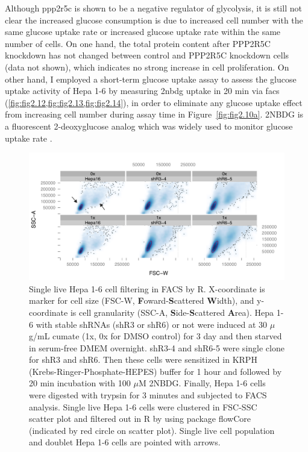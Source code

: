 Although \gls{ppp2r5c} is shown to be a negative regulator of glycolysis, it is still not clear the increased glucose consumption is due to increased cell number with the same glucose uptake rate or increased glucose uptake rate within the same number of cells. On one hand, the total protein content after PPP2R5C knockdown has not changed between control and PPP2R5C knockdown cells (data not shown), which indicates no strong increase in cell proliferation. On other hand, I employed a short-term glucose uptake assay to assess the glucose uptake activity of Hepa 1-6 by measuring \gls{2nbdg} uptake in 20 min via \gls{facs} (\cref{fig:fig2.12,fig:fig2.13,fig:fig2.14}), in order to eliminate any glucose uptake effect from increasing cell number during assay time in Figure~\ref{fig:fig2.10a}. 2NBDG is a fluorescent 2-deoxyglucose analog which was widely used to monitor glucose uptake rate \cite{zou_2-nbdg_2005,nitin_molecular_2009,oneil_uptake_2005,zhong_histone_2010,kawauchi_p53_2008}.

\begin{figure}[!tbp]
\centering
\includegraphics[width=1\textwidth]{figs/fig2-12 facs filter new.pdf}
\caption[FACS filtering for single live Hepa 1-6 cell]{\footnotesize Single live Hepa 1-6 cell filtering in FACS by R. X-coordinate is marker for cell size (FSC-W, \textbf{F}oward-\textbf{S}cattered \textbf{W}idth), and y-coordinate is cell granularity (SSC-A, \textbf{S}ide-\textbf{S}cattered \textbf{A}rea). Hepa 1-6 with stable shRNAs (shR3 or shR6) or not were induced at 30 $\mu$g/mL cumate (1x, 0x for DMSO control) for 3 day and then starved in serum-free DMEM overnight. shR3-4 and shR6-5 were single clone for shR3 and shR6. Then these cells were sensitized in KRPH (Krebs-Ringer-Phosphate-HEPES) buffer for 1 hour and followed by 20 min incubation with 100 $\mu$M 2NBDG. Finally, Hepa 1-6 cells were digested with trypsin for 3 minutes and subjected to FACS analysis. Single live Hepa 1-6 cells were clustered in FSC-SSC scatter plot and filtered out in R by using package flowCore (indicated by red circle on scatter plot). Single live cell population and doublet Hepa 1-6 cells are pointed with arrows. }
\label{fig:fig2.12}
\end{figure}

